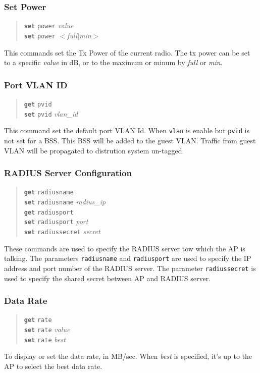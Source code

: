 \documentclass[10pt,fullpage]{article}
\newcommand{\bv}{\begin{verse}}
\newcommand{\ev}{\end{verse}}
\newcommand{\clicmd}[1]{{\textbf{\texttt{#1}}}}
\newcommand{\cliparam}[1]{{\texttt{#1}}}
\newcommand{\clival}[1]{{\emph{#1}}}
\begin{document}
\subsubsection{Set Power}
\bv
\clicmd{set} \cliparam{power} \clival{value}\\
\clicmd{set} \cliparam{power} $<$\clival{full}$|$\clival{min}$>$
\ev
This commands set the Tx Power of the current radio. The tx power can be set to a specific 
\clival{value} in dB, or to the maximum or minum by \clival{full} or \clival{min}.

\subsubsection{Port VLAN ID}
\bv
\clicmd{get} \cliparam{pvid}\\
\clicmd{set} \cliparam{pvid} \clival{vlan\_id}
\ev
This command set the default port VLAN Id. When \cliparam{vlan} is enable but \cliparam{pvid}
is not set for a BSS. This BSS will be added to the guest VLAN. Traffic from guest VLAN will
be propagated to distrution system un-tagged.

\subsubsection{RADIUS Server Configuration}
\bv
\clicmd{get} \cliparam{radiusname}\\
\clicmd{set} \cliparam{radiusname} \clival{radius\_ip}\\
\clicmd{get} \cliparam{radiusport}\\
\clicmd{set} \cliparam{radiusport} \clival{port}\\
\clicmd{set} \cliparam{radiussecret} \clival{secret}
\ev
These commands are used to specify the RADIUS server tow which the AP
is talking.  The parameters \cliparam{radiusname} and
\cliparam{radiusport} are used to specify the IP address and port
number of the RADIUS server.  The parameter \cliparam{radiussecret} is
used to specify the shared secret between AP and RADIUS server.

\subsubsection{Data Rate}
\bv
\clicmd{get} \cliparam{rate}\\
\clicmd{set} \cliparam{rate} \clival{value}\\
\clicmd{set} \cliparam{rate} \clival{best}
\ev
To display or set the data rate, in MB/sec. When \clival{best} is specified, 
it's up to the AP to select the best data rate.
\end{document}
